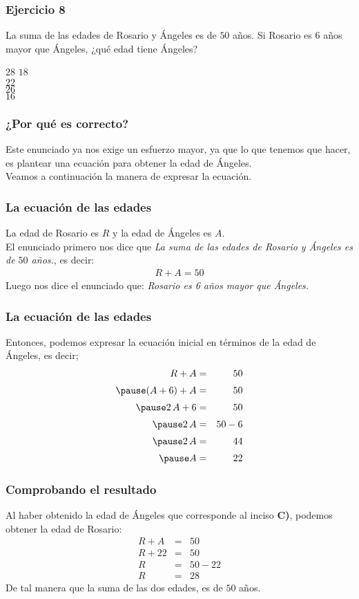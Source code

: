 \begin{frame}
\frametitle{Ejercicio 8}
La suma de las edades de Rosario y Ángeles es de $50$ años. Si Rosario es $6$ años mayor que Ángeles, ¿qué edad tiene Ángeles?
\begin{choices}
\choice $28$
\choice $18$ \\
\choice $22$ \\
\choice $26$ \\
\choice $16$ \\
\end{choices}
\pause
{}
\end{frame}
\begin{frame}
\frametitle{¿Por qué es correcto?}
Este enunciado ya nos exige un esfuerzo mayor, ya que lo que tenemos que hacer, es plantear una ecuación para obtener la edad de Ángeles.
\\
\bigskip
\pause
Veamos a continuación la manera de expresar la ecuación.
\end{frame}
\begin{frame}
\frametitle{La ecuación de las edades}
La edad de Rosario es $R$ y la edad de Ángeles es $A$.
\\
\bigskip
El enunciado primero nos dice que \emph{La suma de las edades de Rosario y Ángeles es de $50$ años.}, es decir:
\begin{align*}
R + A =  50
\end{align*}
\pause
Luego nos dice el enunciado que: \emph{Rosario es 6 años mayor que Ángeles.}
\end{frame}
\begin{frame}
\frametitle{La ecuación de las edades}
Entonces, podemos expresar la ecuación inicial en términos de la edad de Ángeles, es decir;
\pause
\begin{eqnarray*}
R + A &=& 50 \\[0.25em] \pause
(A + 6) + A &=& 50 \\[0.25em] \pause
2 \, A + 6 &=& 50 \\[0.25em] \pause
2 \, A &=& 50 - 6 \\[0.25em] \pause
2 \, A &=& 44 \\[0.25em] \pause
A &=& 22
\end{eqnarray*}
\end{frame}
\begin{frame}
\frametitle{Comprobando el resultado}
Al haber obtenido la edad de Ángeles que corresponde al inciso \textbf{C)}, podemos obtener la edad de Rosario:
\pause
\begin{eqnarray*}
R + A &=& 50 \\[0.25em]
R + 22 &=& 50 \\[0.25em]
R &=& 50 - 22 \\[0.25em]
R &=& 28
\end{eqnarray*}
\pause
De tal manera que la suma de las dos edades, es de $50$ años.
\end{frame}
